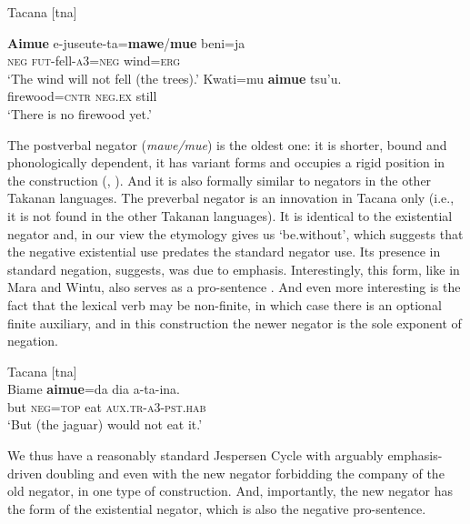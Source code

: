﻿\documentclass[output=paper,draft,draftmode,colorlinks,citecolor=brown]{langscibook}
\begin{document}
\newpage
\begin{exe}\ex\label{ex:int-tacana-wind-firewood}
Tacana [tna] 
\begin{xlist}
    \ex\gll \textbf{Aimue}    e-juseute-ta=\textbf{mawe}/\textbf{mue}
    beni=ja \\
    \textsc{neg}    \textsc{fut-}fell-\textsc{a}3=\textsc{neg}    wind=\textsc{erg} \\
    \glt `The wind will not fell (the trees).'
    \ex\gll Kwati=mu    \textbf{aimue}    tsu'u.\\
firewood=\textsc{cntr}  \textsc{neg.ex}  still\\
\glt `There is no firewood yet.'
    \end{xlist}\end{exe}
%
The postverbal negator (\textit{mawe/mue}) is the oldest one: it is
shorter, bound and phonologically dependent, it has variant forms and
occupies a rigid position in the construction (\citealt{Guillaume2016a},
). And it is also formally similar to
negators in the
other Takanan languages. The preverbal negator is an innovation in
Tacana
only (i.e., it is not found in the other Takanan languages). It is
identical to the existential negator and, in our view 
\parencite{AuweraKrasnoukhova2018} the etymology gives us `be.without',
which suggests that the negative existential use predates the standard
negator use. Its presence in standard negation, \textcite{Guillaume2016a}
suggests, was due to emphasis. Interestingly, this form, like in Mara and
Wintu, also serves as a pro-sentence \parencites{Guillaume2016a}{Guillaume2017}. And
even more interesting is the fact that the lexical verb may be non-finite,
in which case there is an optional finite auxiliary, and in this
construction the newer negator is the sole exponent of negation.
%
\begin{exe}\ex\label{ex:int-tacana-jaguar}
 Tacana [tna]   \\
    \gll    Biame    \textbf{aimue}=da  dia  {\op}a-ta-ina{\cp}.  \\
    but    \textsc{neg=top}  eat  \textsc{aux.tr-a3-pst.hab}  \\
    \glt `But (the jaguar) would not eat it.'
    \end{exe}
%
We thus have a reasonably standard Jespersen Cycle with arguably
emphasis-driven doubling and even with the new negator forbidding the
company of the old negator, in one type of construction. And, importantly,
the new negator has the form of the existential negator, which is also the
negative pro-sentence.
\end{document}
